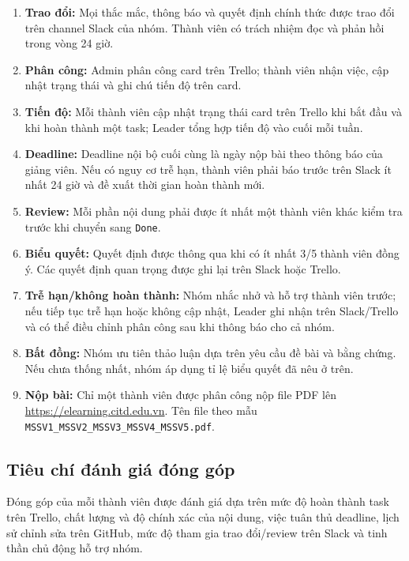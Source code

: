\documentclass[12pt,a4paper]{article}
\begin{document}
\begin{enumerate}
  \item \textbf{Trao đổi:} Mọi thắc mắc, thông báo và quyết định chính thức được trao đổi trên channel Slack của nhóm. Thành viên có trách nhiệm đọc và phản hồi trong vòng 24 giờ.
  \item \textbf{Phân công:} Admin phân công card trên Trello; thành viên nhận việc, cập nhật trạng thái và ghi chú tiến độ trên card.
  \item \textbf{Tiến độ:} Mỗi thành viên cập nhật trạng thái card trên Trello khi bắt đầu và khi hoàn thành một task; Leader tổng hợp tiến độ vào cuối mỗi tuần.
  \item \textbf{Deadline:} Deadline nội bộ cuối cùng là ngày nộp bài theo thông báo của giảng viên. Nếu có nguy cơ trễ hạn, thành viên phải báo trước trên Slack ít nhất 24 giờ và đề xuất thời gian hoàn thành mới.
  \item \textbf{Review:} Mỗi phần nội dung phải được ít nhất một thành viên khác kiểm tra trước khi chuyển sang \texttt{Done}.
  \item \textbf{Biểu quyết:} Quyết định được thông qua khi có ít nhất 3/5 thành viên đồng ý. Các quyết định quan trọng được ghi lại trên Slack hoặc Trello.
  \item \textbf{Trễ hạn/không hoàn thành:} Nhóm nhắc nhở và hỗ trợ thành viên trước; nếu tiếp tục trễ hạn hoặc không cập nhật, Leader ghi nhận trên Slack/Trello và có thể điều chỉnh phân công sau khi thông báo cho cả nhóm.
  \item \textbf{Bất đồng:} Nhóm ưu tiên thảo luận dựa trên yêu cầu đề bài và bằng chứng. Nếu chưa thống nhất, nhóm áp dụng tỉ lệ biểu quyết đã nêu ở trên.
  \item \textbf{Nộp bài:} Chỉ một thành viên được phân công nộp file PDF lên \url{https://elearning.citd.edu.vn}. Tên file theo mẫu \texttt{MSSV1\_MSSV2\_MSSV3\_MSSV4\_MSSV5.pdf}.
\end{enumerate}

\subsection{Tiêu chí đánh giá đóng góp}

Đóng góp của mỗi thành viên được đánh giá dựa trên mức độ hoàn thành task trên
Trello, chất lượng và độ chính xác của nội dung, việc tuân thủ deadline, lịch sử
chỉnh sửa trên GitHub, mức độ tham gia trao đổi/review trên Slack và tinh thần
chủ động hỗ trợ nhóm.
\end{document}
